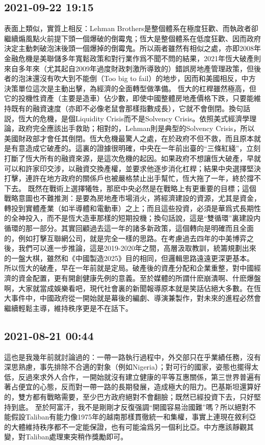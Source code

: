 \documentclass[twocolumn]{ctexart}
\begin{document}
\subsection*{2021-09-22 19:15}

表面上類似，實質上相反：Lehman Brothers是整個體系在極度狂歡、而執政者卻繼續煽風點火前提下頭一個爆破的倒霉鬼；恆大是整個體系在低度狂歡、因而政府決定主動刺破泡沫後頭一個爆掉的倒霉鬼。所以兩者雖然有相似之處，亦即2008年金融危機是美聯儲多年寬鬆政策和對行業作爲不聞不問的結果，2021年恆大破產則來自多年來（尤其起自2009年過度財政刺激所導致的）錯誤房地產管理政策，但後者的泡沫還沒有吹大到不能倒（Too big to fail）的地步，因而和美國相反，中方決策單位這次是主動出擊，為經濟的全面轉型做準備。
恆大的杠桿雖然極高，但它的投機性資產（主要是造車）佔少數，即使中國整體房地產價格下跌，只要能維持既有的融資速度（亦即不必像老鼠會那樣指數成長），它就不會倒閉。換句話説，恆大的危機，是個Liquidity Crisis而不是Solvency Crisis。依照美式經濟學理論，政府完全應該出手救助；相對的，Lehman則是典型的Solvency Crisis，所以美國財政部才會任其倒閉。恆大危機最驚人之處，在於政府不但不救，而且原本就是有意造成它破產的。這裏的證據很明確，中央在一年前出臺的“三條紅綫”，立刻打斷了恆大所有的融資來源，是這次危機的起因。如果政府不想讓恆大破產，早就可以和許家印交涉，以融資交換產權，並要求他逐步消化杠桿；結果中央選擇堅決打擊，連許在地方政府的關係戶也被嚴格禁止出手幫忙，恆大拖了一年，終於撐不下去。
既然在戰術上選擇犧牲，那麽中央必然是在戰略上有更重要的目標；這個戰略意圖也不難推測：是要為房地產市場消火，將經濟建設的資源，尤其是資金，轉投到實體產業（如半導體和電動車）之上；而且這些投資，必須是華爲式長期性的全神投入，而不是恆大造車那樣的短期投機；換句話說，這是“雙循環”裏建設内循環的那一部分。其實回顧過去這一年的諸多新政策，這個轉向是明確而且全面的，例如打擊互聯網公司，就是完全一樣的思路。在考慮過去四年的中美博弈之後，我們可以進一步推論，這是2019-2020年之間，高層汲取教訓，統籌規劃出來的一盤大棋，雖然和《中國製造2025》目的相同，但邏輯思路遠遠更深更基本。
所以恆大的破產，早在一年前就是定局。破產後的資產分配和企業重整，對中國經濟的資金配置，更有開創健康先例的意義。至於媒體的所謂什麽崩潰啊、什麽爆盤啊，大家就當成娛樂看吧，現代社會裏的新聞報導原本就是笑話佔絕大多數。在恆大事件中，中國政府從一開始就是幕後的編劇、導演兼製作，對未來的進程必然會繼續輕鬆主導，維持秩序更是不在話下。
\subsection*{2021-08-21 00:44}

這也是我幾年前就討論過的：一帶一路執行過程中，外交部只在乎業績任務，沒有深思熟慮，事先排除不合適的對象（例如Nigeria）；對可行的國家，姿態也擺得太低，反過來求外人合作，一開始就沒有建立健康的平等互惠關係，第三世界普遍有著占便宜的心態，反而對一帶一路的長期發展，造成極大的阻力。巴基斯坦還算好的，雙方都有戰略需要，至少巴方政府絕對不會翻臉；既然已經投資下去，只好堅持到底。
至於阿富汗，我不是剛剛才反復强調“開國容易治國難”嗎？所以絕對不能假設Taliban有能力像1975年的越南那樣貫徹統一和集權，事實上連現在敘利亞的大體維持秩序都不一定能保證，也有可能淪爲另一個利比亞。中方應該靜觀其變，對Taliban處理東突稍作獎勵即可。
\end{document}
